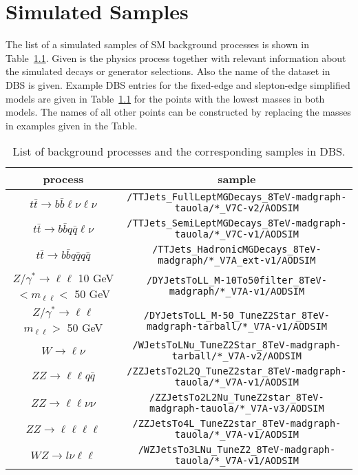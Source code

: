\chapter{Simulated Samples}
The list of a simulated samples of SM background processes is shown in Table~\ref{appTab:MCSamples}. Given is the physics process together with relevant information about the simulated decays or generator selections. Also the name of the dataset in DBS is given. Example DBS entries for the fixed-edge and slepton-edge simplified models are given in Table~\ref{appTab:MCSamples} for the points with the lowest masses in both models. The names of all other points can be constructed by replacing the masses in examples given in the Table. 





\begin{table}[htb] 
\scriptsize
\caption{List of background processes and the corresponding samples in DBS.}
\label{appTab:MCSamples}
\begin{tabular}{c|c}
 process & sample \\
\hline 
$t\bar{t} \rightarrow b\bar{b}\ell\nu \ell\nu$ & \verb+/TTJets_FullLeptMGDecays_8TeV-madgraph-tauola/*_V7C-v2/AODSIM+ \\
$t\bar{t} \rightarrow b\bar{b}q\bar{q}\ell\nu$ & \verb+/TTJets_SemiLeptMGDecays_8TeV-madgraph-tauola/*_V7C-v1/AODSIM+ \\
$t\bar{t} \rightarrow b\bar{b}q\bar{q}q\bar{q}$ & \verb+/TTJets_HadronicMGDecays_8TeV-madgraph/*_V7A_ext-v1/AODSIM+ \\
\hline 
$Z/\gamma^{*} \rightarrow \ell\ell$ 10 GeV $< m_{\ell\ell} <$ 50 GeV & \verb+/DYJetsToLL_M-10To50filter_8TeV-madgraph/*_V7A-v1/AODSIM+ \\
$Z/\gamma^{*} \rightarrow \ell\ell$ $m_{\ell\ell} >$ 50 GeV & \verb+/DYJetsToLL_M-50_TuneZ2Star_8TeV-madgraph-tarball/*_V7A-v1/AODSIM+ \\
\hline 
$W \rightarrow \ell\nu$ & \verb+/WJetsToLNu_TuneZ2Star_8TeV-madgraph-tarball/*_V7A-v2/AODSIM+ \\
\hline 
$ZZ \rightarrow \ell\ell q\bar{q}$ & \verb+/ZZJetsTo2L2Q_TuneZ2star_8TeV-madgraph-tauola/*_V7A-v1/AODSIM+ \\
$ZZ \rightarrow \ell\ell\nu\nu$ & \verb+/ZZJetsTo2L2Nu_TuneZ2star_8TeV-madgraph-tauola/*_V7A-v3/AODSIM+ \\
$ZZ \rightarrow \ell\ell\ell\ell$ & \verb+/ZZJetsTo4L_TuneZ2star_8TeV-madgraph-tauola/*_V7A-v1/AODSIM+ \\
$WZ \rightarrow l\nu \ell\ell$ & \verb+/WZJetsTo3LNu_TuneZ2_8TeV-madgraph-tauola/*_V7A-v1/AODSIM+ \\

\end{tabular}
\end{table}
